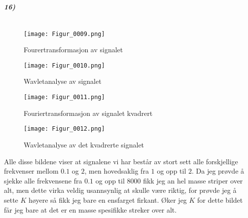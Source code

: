 \documentclass[11pt, A4paper,norsk]{article}
\begin{document}
			\subparagraph{16)} $ $
				\begin{figure}[H]
\texttt{[image: Figur\_0009.png]}
\caption{Fourertransformasjon av signalet}
				\end{figure}
				\begin{figure}[H]
\texttt{[image: Figur\_0010.png]}
\caption{Wavletanalyse av signalet}
				\end{figure}
				\begin{figure}[H]
\texttt{[image: Figur\_0011.png]}
\caption{Fouriertransformasjon av signalet kvadrert}
				\end{figure}
				\begin{figure}[H]
\texttt{[image: Figur\_0012.png]}
\caption{Wavletanalyse av det kvadrerte signalet}
				\end{figure}
				\begin{flushleft}
Alle disse bildene viser at signalene vi har består av stort sett alle forskjellige frekvenser mellom $0.1$ og $2$, men hovedsaklig fra $1$ og opp til $2$. Da jeg prøvde å sjekke alle frekvensene fra $0.1$ og opp til $8000$ fikk jeg an hel masse striper over alt, men dette virka veldig usannsynlig at skulle være riktig, for prøvde jeg å sette $K$ høyere så fikk jeg bare en ensfarget firkant. Øker jeg $K$ for dette bildet får jeg bare at det er en masse spesifikke streker over alt.
				\end{flushleft}

\end{document}
